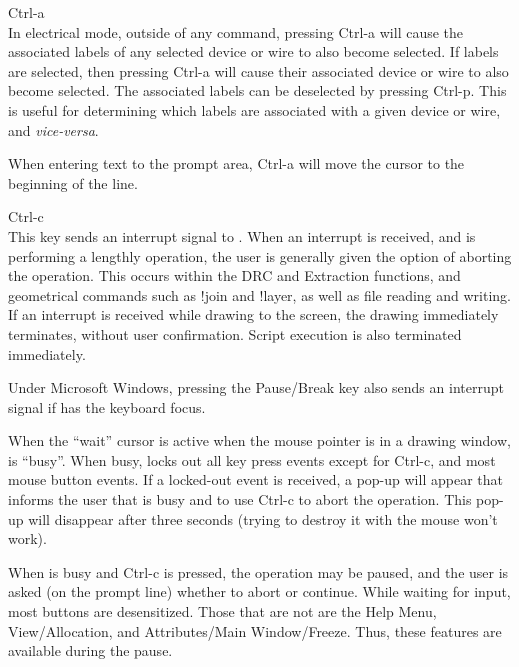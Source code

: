 \begin{description}
\item{\kb Ctrl-a}\\
In electrical mode, outside of any command, pressing {\kb Ctrl-a} will
cause the associated labels of any selected device or wire to also
become selected.  If labels are selected, then pressing {\kb Ctrl-a}
will cause their associated device or wire to also become selected. 
The associated labels can be deselected by pressing {\kb Ctrl-p}. 
This is useful for determining which labels are associated with a
given device or wire, and {\it vice-versa}.

When entering text to the prompt area, {\kb Ctrl-a} will move the
cursor to the beginning of the line.

\item{\kb Ctrl-c}\\
This key sends an interrupt signal to {\Xic}.  When an interrupt is
received, and {\Xic} is performing a lengthly operation, the user is
generally given the option of aborting the operation.  This occurs
within the DRC and Extraction functions, and geometrical commands such
as {\cb !join} and {\cb !layer}, as well as file reading and writing. 
If an interrupt is received while drawing to the screen, the drawing
immediately terminates, without user confirmation.  Script execution
is also terminated immediately.

Under Microsoft Windows, pressing the {\kb Pause/Break} key also sends
an interrupt signal if {\Xic} has the keyboard focus.

When the ``wait'' cursor is active when the mouse pointer is in a
drawing window, {\Xic} is ``busy''.  When busy, {\Xic} locks out all
key press events except for {\kb Ctrl-c}, and most mouse button
events.  If a locked-out event is received, a pop-up will appear that
informs the user that {\Xic} is busy and to use {\kb Ctrl-c} to abort
the operation.  This pop-up will disappear after three seconds (trying
to destroy it with the mouse won't work).

When {\Xic} is busy and {\kb Ctrl-c} is pressed, the operation may be
paused, and the user is asked (on the prompt line) whether to abort or
continue.  While waiting for input, most buttons are desensitized. 
Those that are not are the {\cb Help Menu}, {\cb View/Allocation}, and
{\cb Attributes/Main Window/Freeze}.  Thus, these features are
available during the pause.


\end{description}
